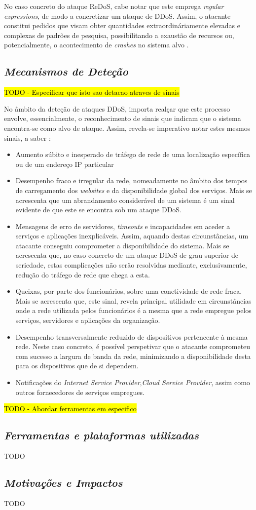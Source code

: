 No caso concreto do ataque ReDoS, cabe notar que este emprega \textit{regular expressions}, de modo a concretizar um ataque de DDoS. Assim, o atacante constitui pedidos que visam obter quantidades extraordináriamente elevadas e complexas de padrões de pesquisa, possibilitando a exaustão de recursos ou, potencialmente, o acontecimento de \textit{crashes} no sistema alvo \cite{esecurityplanet_types_of_ddos_attacks}.


\subsection{\textit{Mecanismos de Deteção}}

\hl{TODO - Especificar que isto sao detacao atraves de sinais}

No âmbito da deteção de ataques DDoS, importa realçar que este processo envolve, essencialmente, o reconhecimento de sinais que indicam que o sistema encontra-se como alvo de ataque. Assim, revela-se imperativo notar estes mesmos sinais, a saber \cite{cybergc_defending_agaisnt_ddos}:
\begin{itemize}
    \item Aumento súbito e inesperado de tráfego de rede de uma localização específica ou de um endereço IP particular
    \item Desempenho fraco e irregular da rede, nomeadamente no âmbito dos tempos de carregamento dos \textit{websites} e da disponibilidade global dos serviços. Mais se acrescenta que um abrandamento considerável de um sistema é um sinal evidente de que este se encontra sob um ataque DDoS.
    \item Mensagens de erro de servidores, \textit{timeouts} e incapacidades em aceder a serviços e aplicações inexplicáveis. Assim, aquando destas circunstâncias, um atacante conseguiu comprometer a disponibilidade do sistema. Mais se acrescenta que, no caso concreto de um ataque DDoS de grau superior de seriedade, estas complicações não serão resolvidas mediante, exclusivamente, redução do tráfego de rede que chega a esta.
    \item Queixas, por parte dos funcionários, sobre uma conetividade de rede fraca. Mais se acrescenta que, este sinal, revela principal utilidade em circunstâncias onde a rede utilizada pelos funcionários é a mesma que a rede empregue pelos serviços, servidores e aplicações da organização.
    \item Desempenho transversalmente reduzido de dispositivos pertencente à mesma rede. Neste caso concreto, é possível perspetivar que o atacante comprometeu com sucesso a largura de banda da rede, minimizando a disponibilidade desta para os dispositivos que de si dependem.
    \item Notificações do \textit{Internet Service Provider},\textit{Cloud Service Provider}, assim como outros fornecedores de serviços empregues.
\end{itemize}

\hl{TODO - Abordar ferramentas em especifico}

\subsection{\textit{Ferramentas e plataformas utilizadas}}
TODO


\subsection{\textit{Motivações e Impactos}}
TODO
